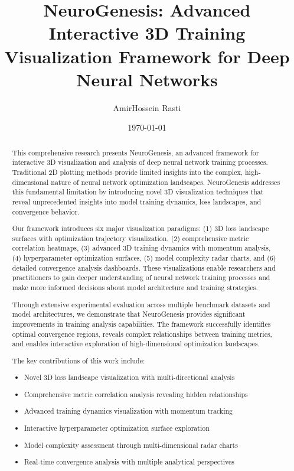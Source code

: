 \documentclass[12pt,a4paper]{article}
\title{NeuroGenesis: Advanced Interactive 3D Training Visualization Framework for Deep Neural Networks}
\author{AmirHossein Rasti}
\date{\today}
\begin{document}
\maketitle

\begin{abstract}
This comprehensive research presents NeuroGenesis, an advanced framework for interactive 3D visualization and analysis of deep neural network training processes. Traditional 2D plotting methods provide limited insights into the complex, high-dimensional nature of neural network optimization landscapes. NeuroGenesis addresses this fundamental limitation by introducing novel 3D visualization techniques that reveal unprecedented insights into model training dynamics, loss landscapes, and convergence behavior.

Our framework introduces six major visualization paradigms: (1) 3D loss landscape surfaces with optimization trajectory visualization, (2) comprehensive metric correlation heatmaps, (3) advanced 3D training dynamics with momentum analysis, (4) hyperparameter optimization surfaces, (5) model complexity radar charts, and (6) detailed convergence analysis dashboards. These visualizations enable researchers and practitioners to gain deeper understanding of neural network training processes and make more informed decisions about model architecture and training strategies.

Through extensive experimental evaluation across multiple benchmark datasets and model architectures, we demonstrate that NeuroGenesis provides significant improvements in training analysis capabilities. The framework successfully identifies optimal convergence regions, reveals complex relationships between training metrics, and enables interactive exploration of high-dimensional optimization landscapes.

The key contributions of this work include:
\begin{itemize}
    \item Novel 3D loss landscape visualization with multi-directional analysis
    \item Comprehensive metric correlation analysis revealing hidden relationships
    \item Advanced training dynamics visualization with momentum tracking
    \item Interactive hyperparameter optimization surface exploration
    \item Model complexity assessment through multi-dimensional radar charts
    \item Real-time convergence analysis with multiple analytical perspectives
\end{itemize}


\end{abstract}
\end{document}
